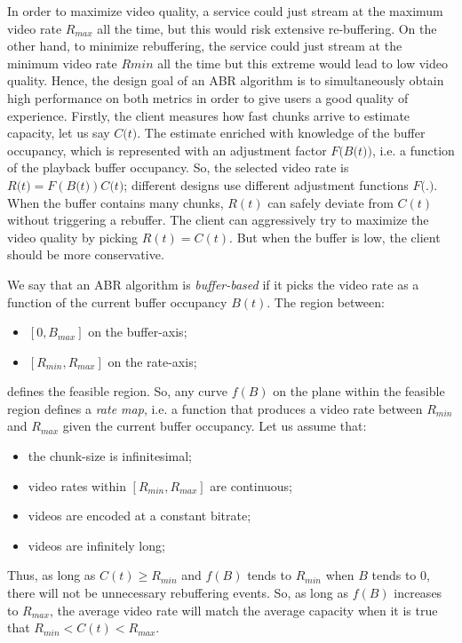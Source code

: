 \documentclass[a4paper]{report}
\begin{document}
In order to maximize video quality, a service could just stream at the maximum video rate $R_{max}$ all the time, but this would risk extensive re-buffering. On the other hand, to minimize rebuffering, the service could just stream at the minimum video rate $Rmin$ all the time but this extreme would lead to low video quality. Hence, the design goal of an ABR algorithm is to simultaneously obtain high performance on both metrics in order to give users a good quality of experience.
Firstly, the client measures how fast chunks arrive to estimate capacity, let us say $C\textit{(}t\textit{)}$. The estimate enriched with knowledge of the buffer occupancy, which is represented with an  adjustment factor  $F\textit{(}B\textit{(}t\textit{)}\textit{)}$, i.e. a function of the playback buffer occupancy. So, the selected video rate is $R\textit{(}t\textit{)} = F(B\textit{(}t\textit{)})C\textit{(}t\textit{)}$; different designs use different adjustment functions $F\textit{(}.\textit{)}$.
When the buffer contains many chunks, $R(t)$ can safely deviate from $C(t)$ without triggering a rebuffer. The client can aggressively try to maximize the video quality by picking $R(t) = C(t)$. But when the buffer is low, the client should be more conservative.

We say that an ABR algorithm is \textit{buffer-based} if it picks the video rate as a function of the current buffer occupancy $B(t)$.
The region between:
\begin{itemize}
\item $[0, B_{max}]$ on the buffer-axis;
\item $[R_{min}, R_{max}]$ on the rate-axis;
\end{itemize}
defines the feasible region. So, any curve $f(B)$ on the plane within the feasible region defines a \textit{rate map}, i.e. a function that produces a video rate between $R_{min}$ and $R_{max}$ given the current buffer occupancy.
Let us assume that:
\begin{itemize}
\item the chunk-size is infinitesimal;
\item video rates within $[R_{min}, R_{max}]$ are continuous;
\item videos are encoded at a constant bitrate;
\item videos are infinitely long;
\end{itemize}
Thus, as long as $C(t) \geq R_{min}$ and $f(B)$ tends to $R_{min}$ when $B$ tends to $0$, there will not be unnecessary rebuffering events. So, as long as $f(B)$ increases to $R_{max}$, the average video rate will match the average capacity when it is true that $R_{min}<C(t)<R_{max}$.
\end{document}
